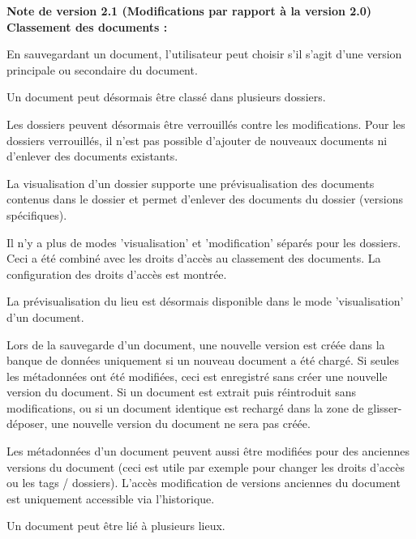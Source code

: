 \vspace{\baselineskip}

\textbf{Note de version 2.1 (Modifications par rapport à la version 2.0)} \\

\textbf{Classement des documents :}

\begin{compactitem}
	\item En sauvegardant un document, l'utilisateur peut choisir s'il s'agit d'une version principale ou secondaire du document.
	\item Un document peut désormais être classé dans plusieurs dossiers.
	\item Les dossiers peuvent désormais être verrouillés contre les modifications. Pour les dossiers verrouillés, il n'est pas possible d'ajouter de nouveaux documents ni d'enlever des documents existants.
	\item La visualisation d'un dossier supporte une prévisualisation des documents contenus dans le dossier et permet d'enlever des documents du dossier (versions spécifiques).
	\item Il n'y a plus de modes 'visualisation' et 'modification' séparés pour les dossiers. Ceci a été combiné avec les droits d'accès au classement des documents. La configuration des droits d'accès est montrée.
	\item La prévisualisation du lieu est désormais disponible dans le mode 'visualisation' d'un document.
	\item Lors de la sauvegarde d'un document, une nouvelle version est créée dans la banque de données uniquement si un nouveau document a été chargé. Si seules les métadonnées ont été modifiées, ceci est enregistré sans créer une nouvelle version du document. Si un document est extrait puis réintroduit sans modifications, ou si un document identique est rechargé dans la zone de glisser-déposer, une nouvelle version du document ne sera pas créée.
	\item Les métadonnées d'un document peuvent aussi être modifiées pour des anciennes versions du document (ceci est utile par exemple pour changer les droits d'accès ou les tags / dossiers). L'accès modification de versions anciennes du document est uniquement accessible via l'historique.
	\item Un document peut être lié à plusieurs lieux.
\end{compactitem}

